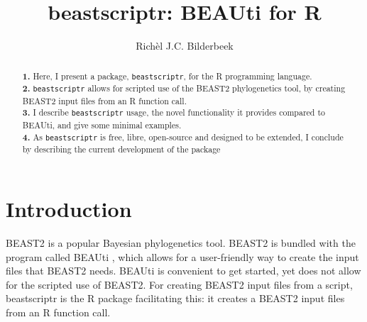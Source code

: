 \documentclass{article}
\title{beastscriptr: BEAUti for R}
\author{Rich\`el J.C. Bilderbeek}
\begin{document}
\maketitle

\begin{abstract}
  \textbf{1. }
  Here, I present a package, \verb;beastscriptr;, for the R programming language. \\
  \textbf{2. }
    \verb;beastscriptr; allows for scripted use of the BEAST2 phylogenetics tool, 
    by creating BEAST2 input files from an R function call. \\
  \textbf{3. }
    I describe \verb;beastscriptr; usage, the novel functionality it provides
    compared to BEAUti, and give some minimal examples. \\
  \textbf{4. }
    As \verb;beastscriptr; is free, libre, open-source and designed to be extended, 
    I conclude by describing the current development of the package \\
\end{abstract}


\section{Introduction}

BEAST2 \cite{bouckaert2014beast} is a popular Bayesian phylogenetics tool.
BEAST2 is bundled with the program called BEAUti \cite{drummond2012bayesian},
which  allows for a user-friendly way to create the
input files that BEAST2 needs. BEAUti is convenient to get started, yet
does not allow for the scripted use of BEAST2. For creating BEAST2 input
files from a script, beastscriptr is the R package facilitating this:
it creates a BEAST2 input files from an R function call.

\end{document}

